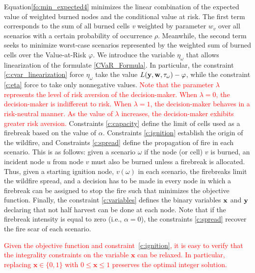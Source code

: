 \documentclass[a4paper,fleqn]{cas-sc}
\begin{document}
Equation\:\eqref{fo:min_expected4} minimizes the linear combination of the expected value of weighted burned nodes and the conditional value at risk. The first term corresponds to the sum of all burned cells \textit{v} weighted by parameter $w_v$ over all scenarios with a certain probability of occurrence $\rho$. Meanwhile, the second term seeks to minimize worst-case scenarios represented by the weighted sum of burned cells over the Value-at-Risk $\varphi$. We introduce the variable $\eta_\omega$ that allows linearization of the formulate \eqref{CVaR_Formula}. In particular, the constraint \textcolor{brown}{\eqref{c:cvar_linearization}} force $\eta_{\omega}$ take the value  $L(\vb{y}, \vb{w}, \tau_\omega) - \varphi$, while the constraint \textcolor{brown}{\eqref{c:eta}} force to take only nonnegative values. \textcolor{red}{Note that the parameter $\lambda$ represents the level of risk aversion of the decision-maker. 
When $\lambda = 0$, the decision-maker is indifferent to risk. 
When $\lambda = 1$, the decision-maker behaves in a risk-neutral manner. 
As the value of $\lambda$ increases, the decision-maker exhibits greater risk aversion.} Constraints \eqref{c:capacity} define the limit of cells used as a firebreak based on the value of $\alpha$. Constraints \eqref{c:ignition} establish the origin of the wildfire, and Constraints \eqref{c:spread} define the propagation of fire in each scenario. This is as follows: given a scenario $\omega$ if the node (or cell) $v$ is burned, an incident node $u$ from node $v$ must also be burned unless a firebreak is allocated. Thus, given a starting ignition node, $v(\omega)$ in each scenario, the firebreaks limit the wildfire spread, and a decision has to be made in every node in which a firebreak can be assigned to stop the fire such that minimizes the objective function. Finally, the constraint \eqref{c:variables} defines the binary variables $\bf{x}$ and $\bf{y}$ declaring that not half harvest can be done at each node. Note that if the firebreak intensity is equal to zero (i.e., $\alpha=0$), the constraints \eqref{c:spread} recover the fire scar of each scenario.

\textcolor{red}{Given the objective function and constraint~\eqref{c:ignition}, it is easy to verify that the integrality constraints on the variable $\mathbf{x}$ can be relaxed. In particular, replacing $\mathbf{x} \in \{0,1\}$ with $0 \leq \mathbf{x} \leq 1$ preserves the optimal integer solution.}
\end{document}

